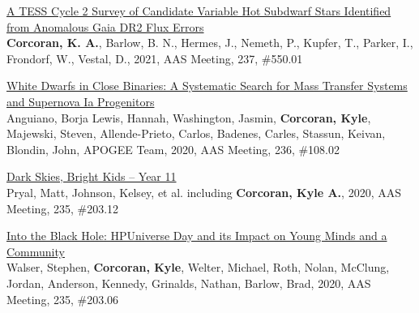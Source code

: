 \documentclass[letterpaper,12pt]{article}
\begin{document}
\vspace{3mm}
\noindent{}
\begin{etaremune}
\item \href{https://ui.adsabs.harvard.edu/abs/2021AAS...23755001C/abstract}{\textcolor{rotundaorange}{A TESS Cycle 2 Survey of Candidate Variable Hot Subdwarf Stars Identified from Anomalous Gaia DR2 Flux Errors}}\\
\textbf{Corcoran, K. A.}, Barlow, B. N., Hermes, J., Nemeth, P., Kupfer, T., Parker, I., Frondorf, W., Vestal, D., 2021, AAS Meeting, 237, \#550.01
\item \href{https://ui.adsabs.harvard.edu/abs/2020AAS...23610802A/abstract}{\textcolor{rotundaorange}{White Dwarfs in Close Binaries: A Systematic Search for Mass Transfer Systems and Supernova Ia Progenitors}}\\
Anguiano, Borja Lewis, Hannah, Washington, Jasmin, \textbf{Corcoran, Kyle}, Majewski, Steven, Allende-Prieto, Carlos, Badenes, Carles, Stassun, Keivan, Blondin, John, APOGEE Team, 2020, AAS Meeting, 236, \#108.02
\item \href{https://ui.adsabs.harvard.edu/abs/2020AAS...23520312P/abstract}{\textcolor{rotundaorange}{Dark Skies, Bright Kids -- Year 11}}\\
Pryal, Matt, Johnson, Kelsey, et al. including \textbf{Corcoran, Kyle A.}, 2020, AAS Meeting, 235, \#203.12
\item \href{https://ui.adsabs.harvard.edu/abs/2020AAS...23520306W/abstract}{\textcolor{rotundaorange}{Into the Black Hole: HPUniverse Day and its Impact on Young Minds and a Community}}\\
Walser, Stephen, \textbf{Corcoran, Kyle}, Welter, Michael, Roth, Nolan, McClung, Jordan, Anderson, Kennedy, Grinalds, Nathan, Barlow, Brad, 2020, AAS Meeting, 235, \#203.06

\end{etaremune}
\end{document}
